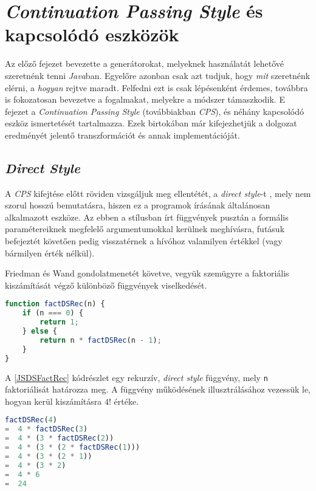 \chapter{\textit{Continuation Passing Style} és kapcsolódó eszközök}

Az előző fejezet bevezette a generátorokat, melyeknek használatát lehetővé szeretnénk tenni \textit{Java}ban. Egyelőre azonban csak azt tudjuk, hogy \textit{mit} szeretnénk elérni, a \textit{hogyan} rejtve maradt. Felfedni ezt is csak lépésenként érdemes, továbbra is fokozatosan bevezetve a fogalmakat, melyekre a módszer támaszkodik. E fejezet a \textit{Continuation Passing Style} (továbbiakban \textit{CPS}), és néhány kapcsolódó eszköz ismertetését tartalmazza. Ezek birtokában már kifejezhetjük a dolgozat eredményét jelentő transzformációt és annak implementációját.

\section{\textit{Direct Style}}

A \textit{CPS} kifejtése előtt röviden vizsgáljuk meg ellentétét, a \textit{direct style}-t \cite{Danvy1994}, mely nem szorul hosszú bemutatásra, hiszen ez a programok írásának általánosan alkalmazott eszköze. Az ebben a stílusban írt függvények pusztán a formális paramétereiknek megfelelő argumentumokkal kerülnek meghívásra, futásuk befejeztét követően pedig visszatérnek a hívóhoz valamilyen értékkel (vagy bármilyen érték nélkül).

Friedman és Wand \citeyear{EssProgLan} gondolatmenetét követve, vegyük szemügyre a faktoriális kiszámítását végző különböző függvények viselkedését.

\begin{lstlisting}[language=JavaScript, caption={\textit{Direct style} faktoriálist meghatározó függvény}, captionpos=b, label=JSDSFactRec]
function factDSRec(n) {
    if (n === 0) {
        return 1;
    } else {
        return n * factDSRec(n - 1);
    }
}
\end{lstlisting}

A \ref{JSDSFactRec} kódrészlet egy rekurzív, \textit{direct style} függvény, mely \texttt{n} faktoriálisát határozza meg. A függvény működésének illusztrálásához vezessük le, hogyan kerül kiszámításra $4!$ értéke.

\begin{lstlisting}[language=JavaScript, caption={$4!$ kiszámítása \texttt{factDSRec} segítségével}, captionpos=b, numbers=none]
   factDSRec(4)
=  4 * factDSRec(3)
=  4 * (3 * factDSRec(2))
=  4 * (3 * (2 * factDSRec(1)))
=  4 * (3 * (2 * 1))
=  4 * (3 * 2)
=  4 * 6
=  24
\end{lstlisting}

